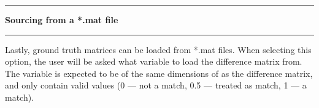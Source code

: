 \noindent\rule{\textwidth}{1pt}
\indent \textbf{Sourcing from a *.mat file}
\noindent\rule{\textwidth}{1pt}
\smallskip
\parbox{\textwidth}{Lastly, ground truth matrices can be loaded from *.mat files. When selecting this option, the user will be asked what variable to load the difference matrix from. The variable is expected to be of the same dimensions of as the difference matrix, and only contain valid values (0 --- not a match, 0.5 --- treated as match, 1 --- a match).}
